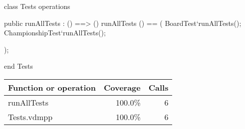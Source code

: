 \begin{vdm_al}
class Tests
 operations

 public runAllTests : () ==> ()
 runAllTests () == (
  BoardTest`runAllTests();
  ChampionshipTest`runAllTests();

 );

end Tests
\end{vdm_al}
\bigskip
\begin{longtable}{|l|r|r|}
\hline
Function or operation & Coverage & Calls \\
\hline
\hline
runAllTests & 100.0\% & 6 \\
\hline
\hline
Tests.vdmpp & 100.0\% & 6 \\
\hline
\end{longtable}

